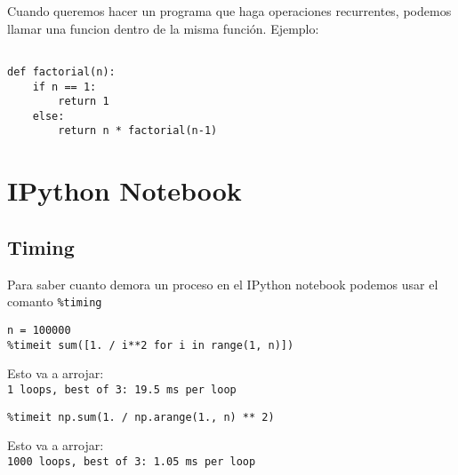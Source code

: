 \documentclass[12pt]{article}
\begin{document}
Cuando queremos hacer un programa que haga operaciones recurrentes, podemos llamar una funcion dentro de la misma funci\'on. Ejemplo:\\

\begin{verbatim}

def factorial(n):
    if n == 1:
        return 1
    else:
        return n * factorial(n-1)

\end{verbatim}


\section{IPython Notebook}

\subsection{Timing}

Para saber cuanto demora un proceso en el IPython notebook podemos usar el comanto \verb+%timing+

\begin{verbatim}
n = 100000
%timeit sum([1. / i**2 for i in range(1, n)])
\end{verbatim}

Esto va a arrojar:\\ 

\verb+1 loops, best of 3: 19.5 ms per loop+

\begin{verbatim}
%timeit np.sum(1. / np.arange(1., n) ** 2)
\end{verbatim}

Esto va a arrojar:\\

\verb+1000 loops, best of 3: 1.05 ms per loop+

{}

\end{document}
